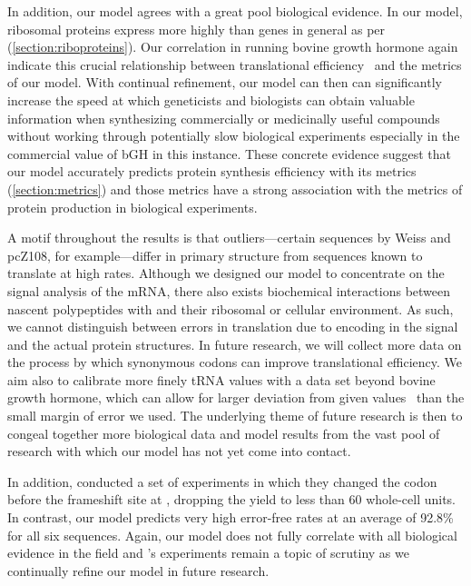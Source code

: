 \documentclass[12pt]{article}
\numberwithin{equation}{section}
\begin{document}
In addition, our model agrees with a great pool biological
evidence. In our model, ribosomal proteins express more highly than
genes in general as per \citet{rpoS:process}
(\autoref{section:riboproteins}).  Our correlation in running bovine
growth hormone again indicate this crucial relationship between
translational efficiency~\cite{schoner:bgh} and the metrics of our
model. With continual refinement, our model can then can significantly
increase the speed at which geneticists and biologists can obtain
valuable information when synthesizing commercially or medicinally
useful compounds without working through potentially slow biological
experiments especially in the commercial value of bGH in this
instance.  These concrete evidence suggest that our model
accurately predicts protein synthesis efficiency with its metrics
(\autoref{section:metrics}) and those metrics have a strong
association with the metrics of protein production in biological experiments.

A motif throughout the results is that outliers---certain sequences by
Weiss and pcZ108, for example---differ in primary structure from
sequences known to translate at high rates. Although we designed our
model to concentrate on the signal analysis of the mRNA, there also
exists biochemical interactions between nascent polypeptides with and
their ribosomal or cellular environment.  As such, we cannot
distinguish between errors in translation due to encoding in the
signal and the actual protein structures. In future research, we will
collect more data on the process by which synonymous codons can
improve translational efficiency. We aim also to calibrate more finely
tRNA values with a data set beyond bovine growth hormone, which can
allow for larger deviation from given values~\cite{lalit:embs} than
the small margin of error we used. The underlying theme of future
research is then to congeal together more biological data and model
results from the vast pool of research with which our model has not
yet come into contact.

In addition, \citet{weiss87} conducted a set of experiments in which
they changed the codon before the frameshift site at {},
dropping the yield to less than 60 whole-cell units. In contrast,
our model predicts very high error-free rates at an average of 92.8\%
for all six sequences. Again, our model does not fully correlate with
all biological evidence in the field and \citeauthor{weiss87}'s
experiments remain a topic of scrutiny as we continually refine our
model in future research.
\end{document}
